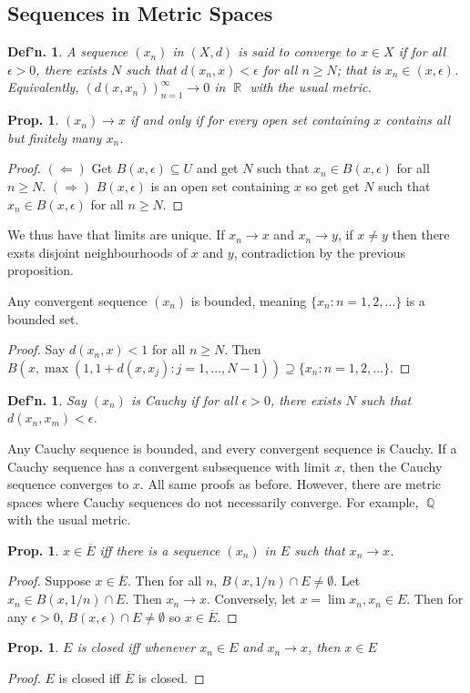 \documentclass[12pt, a4paper]{book}
\DeclareMathOperator{\Q}{\mathbb{Q}}
\DeclareMathOperator{\R}{\mathbb{R}}
\newtheorem{definition}[theorem]{Def'n.}
\newtheorem{proposition}[theorem]{Prop.}
\theoremstyle{nonumberplain}
\newtheorem{proof}{Proof}
\begin{document}
\subsection{Sequences in Metric Spaces}
\begin{definition}
    A sequence $(x_n)$ in $(X,d)$ is said to converge to $x\in X$ if for all $\epsilon>0$, there exists $N$ such that
    $d(x_n,x)<\epsilon$ for all $n\geq N$; that is $x_n\in (x,\epsilon)$. Equivalently, $(d(x,x_n))_{n=1}^\infty\to 0$ in
    $\R$ with the usual metric.
\end{definition}
\begin{proposition}
    $(x_n)\to x$ if and only if for every open set containing $x$ contains all but
    finitely many $x_n$.
\end{proposition}
\begin{proof}
    $(\Leftarrow)$ Get $B(x,\epsilon)\subseteq U$ and get $N$ such that $x_n\in B(x,\epsilon)$ for all $n\geq N$.
    $(\Rightarrow)$ $B(x,\epsilon)$ is an open set containing $x$ so get get $N$ such that $x_n\in B(x,\epsilon)$ for all $n\geq N$.
\end{proof}
We thus have that limits are unique. If $x_n\to x$ and $x_n\to y$, if $x\neq y$ then there exsts disjoint neighbourhoods
of $x$ and $y$, contradiction by the previous proposition.

Any convergent sequence $(x_n)$ is bounded, meaning $\{x_n:n=1,2,\ldots\}$ is a bounded set.
\begin{proof}
    Say $d(x_n,x)<1$ for all $n\geq N$. Then $B(x,\max(1,1+d(x,x_j):j=1,\ldots,N-1))\supseteq\{x_n:n=1,2,\ldots\}$.
\end{proof}
\begin{definition}
    Say $(x_n)$ is \textit{Cauchy} if for all $\epsilon>0$, there exists $N$ such that $d(x_n,x_m)<\epsilon$.
\end{definition}
Any Cauchy sequence is bounded, and every convergent sequence is Cauchy. If a Cauchy sequence has a convergent subsequence
with limit $x$, then the Cauchy sequence converges to $x$. All same proofs as before. However, there are metric spaces where Cauchy
sequences do not necessarily converge. For example, $\Q$ with the usual metric.
\begin{proposition}
    $x\in\overline{E}$ iff there is a sequence $(x_n)$ in $E$ such that $x_n\to x$.
\end{proposition}
\begin{proof}
    Suppose $x\in\overline{E}$. Then for all $n$, $B(x,1/n)\cap E\neq\emptyset$. Let $x_n\in B(x,1/n)\cap E$. Then $x_n\to x$.
    Conversely, let $x=\lim x_n,x_n\in E$. Then for any $\epsilon>0$, $B(x,\epsilon)\cap E\neq\emptyset$ so $x\in\overline{E}$.
\end{proof}
\begin{proposition}
    $E$ is closed iff whenever $x_n\in E$ and $x_n\to x$, then $x\in E$
\end{proposition}
\begin{proof}
    $E$ is closed iff $\overline{E}$ is closed.
\end{proof}
\end{document}
